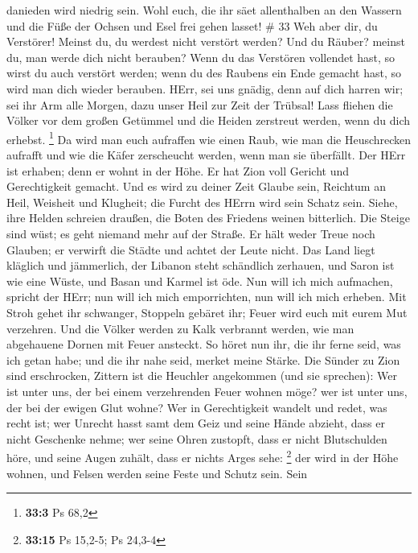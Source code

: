 danieden wird niedrig sein.  Wohl euch, die ihr säet
allenthalben an den Wassern und die Füße der Ochsen und Esel frei gehen
lasset! \# 33  Weh aber dir, du Verstörer! Meinst du, du
werdest nicht verstört werden? Und du Räuber? meinst du, man werde dich
nicht berauben? Wenn du das Verstören vollendet hast, so wirst du auch
verstört werden; wenn du des Raubens ein Ende gemacht hast, so wird man
dich wieder berauben.  HErr, sei uns gnädig, denn auf dich
harren wir; sei ihr Arm alle Morgen, dazu unser Heil zur Zeit der
Trübsal!  Lass fliehen die Völker vor dem großen Getümmel
und die Heiden zerstreut werden, wenn du dich erhebst. \footnote{\textbf{33:3}
  Ps 68,2}  Da wird man euch aufraffen wie einen Raub, wie
man die Heuschrecken aufrafft und wie die Käfer zerscheucht werden, wenn
man sie überfällt.  Der HErr ist erhaben; denn er wohnt in
der Höhe. Er hat Zion voll Gericht und Gerechtigkeit gemacht.
 Und es wird zu deiner Zeit Glaube sein, Reichtum an Heil,
Weisheit und Klugheit; die Furcht des HErrn wird sein Schatz sein.
 Siehe, ihre Helden schreien draußen, die Boten des Friedens
weinen bitterlich.  Die Steige sind wüst; es geht niemand
mehr auf der Straße. Er hält weder Treue noch Glauben; er verwirft die
Städte und achtet der Leute nicht.  Das Land liegt kläglich
und jämmerlich, der Libanon steht schändlich zerhauen, und Saron ist wie
eine Wüste, und Basan und Karmel ist öde.  Nun will ich
mich aufmachen, spricht der HErr; nun will ich mich emporrichten, nun
will ich mich erheben.  Mit Stroh gehet ihr schwanger,
Stoppeln gebäret ihr; Feuer wird euch mit eurem Mut verzehren.
 Und die Völker werden zu Kalk verbrannt werden, wie man
abgehauene Dornen mit Feuer ansteckt.  So höret nun ihr,
die ihr ferne seid, was ich getan habe; und die ihr nahe seid, merket
meine Stärke.  Die Sünder zu Zion sind erschrocken, Zittern
ist die Heuchler angekommen (und sie sprechen): Wer ist unter uns, der
bei einem verzehrenden Feuer wohnen möge? wer ist unter uns, der bei der
ewigen Glut wohne?  Wer in Gerechtigkeit wandelt und redet,
was recht ist; wer Unrecht hasst samt dem Geiz und seine Hände abzieht,
dass er nicht Geschenke nehme; wer seine Ohren zustopft, dass er nicht
Blutschulden höre, und seine Augen zuhält, dass er nichts Arges sehe:
\footnote{\textbf{33:15} Ps 15,2-5; Ps 24,3-4}  der wird in
der Höhe wohnen, und Felsen werden seine Feste und Schutz sein. Sein
